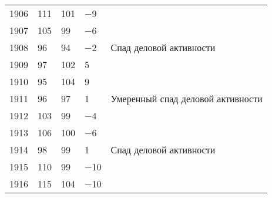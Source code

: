 \documentclass[leqno]{article}  %
\begin{document}
\begin{table}
{\begin{tabular}{p{}|p{}|p{}|p{}|p{}}
1906 & \hfill 111 \hspace*{6mm} & \hfill 101 \hspace*{6mm} & \hfill \(-\)9 \hspace*{6mm} & \\
1907 & \hfill 105 \hspace*{6mm} & \hfill 99 \hspace*{6mm} & \hfill \(-\)6 \hspace*{6mm} & \\
1908 & \hfill 96 \hspace*{6mm} & \hfill 94 \hspace*{6mm} & \hfill \(-\)2 \hspace*{6mm} & Спад деловой активности \\
1909 & \hfill 97 \hspace*{6mm} & \hfill 102 \hspace*{6mm} & \hfill 5 \hspace*{6mm} & \\
1910 & \hfill 95 \hspace*{6mm} & \hfill 104 \hspace*{6mm} & \hfill 9 \hspace*{6mm} & \\
1911 & \hfill 96 \hspace*{6mm} & \hfill 97 \hspace*{6mm} & \hfill 1 \hspace*{6mm} & Умеренный спад деловой активности \\
1912 & \hfill 103 \hspace*{6mm} & \hfill 99 \hspace*{6mm} & \hfill \(-\)4 \hspace*{6mm} & \\
1913 & \hfill 106 \hspace*{6mm} & \hfill 100 \hspace*{6mm} & \hfill \(-\)6 \hspace*{6mm} & \\
1914 & \hfill 98 \hspace*{6mm} & \hfill 99 \hspace*{6mm} & \hfill 1 \hspace*{6mm} & Спад деловой активности \\
1915 & \hfill 110 \hspace*{6mm} & \hfill 99 \hspace*{6mm} & \hfill \(-\)10 \hspace*{6mm} & \\
1916 & \hfill 115 \hspace*{6mm} & \hfill 104 \hspace*{6mm} & \hfill \(-\)10 \hspace*{6mm} & \\

\end{tabular}}
\end{table}
\end{document}
